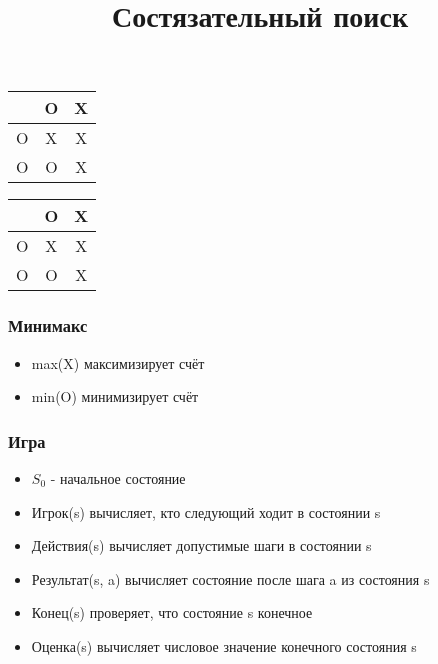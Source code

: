 \documentclass[professionalfonts]{beamer}
\title{Состязательный поиск}
\begin{document}
\newcommand{\tictactoe}[9]{
	\begin{tabular}{c|c|c}
		#1 & #2 & #3 \\ \hline
		#4 & #5 & #6 \\ \hline
		#7 & #8 & #9
	\end{tabular}
	}

\newcommand{\cg}[1]{{\color{green}#1}}
\newcommand{\cy}[1]{{\color{yellow}#1}}

\frame{\titlepage}
\begin{frame}\fontsize{55}{55}\selectfont
	\centering
	\tictactoe{\;}{O}{X}
		{O}{X}{X}
		{O}{O}{X}
\end{frame}

\begin{frame}
	\fontsize{55}{55}\selectfont
	\centering
	\tictactoe{\;}{O}{\cg{X}}
		{O}{X}{\cg{X}}
		{O}{O}{\cg{X}}
\end{frame}


\begin{frame}
	\frametitle{Минимакс}
	\begin{itemize}
		\item max(X) максимизирует счёт
		\item min(O) минимизирует счёт
	\end{itemize}
\end{frame}
\begin{frame}
	\frametitle{Игра}
	\begin{itemize}
		\item $S_0$ - начальное состояние
			\pause
		\item Игрок(s) вычисляет, кто следующий ходит в состоянии s
			\pause
		\item Действия(s) вычисляет допустимые шаги в состоянии s
			\pause
		\item Результат(s, a) вычисляет состояние после шага a из состояния s
			\pause
		\item Конец(s) проверяет, что состояние s конечное
			\pause
		\item Оценка(s) вычисляет числовое значение конечного состояния s
				
	\end{itemize}
\end{frame}
\end{document}
